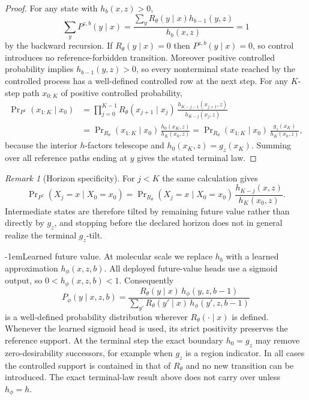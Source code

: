 \documentclass{article}
\makeatletter
\theoremstyle{definition}
\theoremstyle{remark}
\newtheorem{remark}[theorem]{Remark}
\def\paragraph{\@startsection{paragraph}{4}{\z@}{1.0ex plus 0.3ex minus .2ex}%
  {-1em}{\normalsize\bf}}
\makeatother
\begin{document}
\begin{proof}
For any state with $h_b(x,z)>0$,
\[
  \sum_y P^{z,b}(y\mid x)
  =\frac{\sum_y R_\theta(y\mid x)h_{b-1}(y,z)}{h_b(x,z)}=1
\]
by the backward recursion. If $R_\theta(y\mid x)=0$ then $P^{z,b}(y\mid x)=0$, so
control introduces no reference-forbidden transition. Moreover positive
controlled probability implies $h_{b-1}(y,z)>0$, so every nonterminal state
reached by the controlled process has a well-defined controlled row at the next
step. For any $K$-step path $x_{0:K}$ of positive controlled probability,
\[
\begin{aligned}
  \Pr\nolimits_{P^{z}}(x_{1:K}\mid x_0)
  &=\prod_{j=0}^{K-1} R_\theta(x_{j+1}\mid x_j)\,
    \frac{h_{K-j-1}(x_{j+1},z)}{h_{K-j}(x_j,z)}\\
  &=\Pr\nolimits_{R_\theta}(x_{1:K}\mid x_0)\,\frac{h_0(x_K,z)}{h_K(x_0,z)}
   =\Pr\nolimits_{R_\theta}(x_{1:K}\mid x_0)\,\frac{g_z(x_K)}{h_K(x_0,z)},
\end{aligned}
\]
because the interior $h$-factors telescope and $h_0(x_K,z)=g_z(x_K)$. Summing
over all reference paths ending at $y$ gives the stated terminal law.
\end{proof}

\begin{remark}[Horizon specificity]
For $j<K$ the same calculation gives
\[
  \Pr\nolimits_{P^{z}}(X_j=x\mid X_0=x_0)
  =\Pr\nolimits_{R_\theta}(X_j=x\mid X_0=x_0)\,\frac{h_{K-j}(x,z)}{h_K(x_0,z)} .
\]
Intermediate states are therefore tilted by remaining future value rather than
directly by $g_z$, and stopping before the declared horizon does not in general
realize the terminal $g_z$-tilt.
\end{remark}

\paragraph{Learned future value.} At molecular scale we replace $h_b$ with a
learned approximation $h_\phi(x,z,b)$. All deployed future-value heads use a
sigmoid output, so $0<h_\phi(x,z,b)<1$. Consequently
\[
  P_\phi(y\mid x,z,b)
  =\frac{R_\theta(y\mid x)\,h_\phi(y,z,b-1)}
        {\sum_{y'} R_\theta(y'\mid x)\,h_\phi(y',z,b-1)}
\]
is a well-defined probability distribution wherever $R_\theta(\cdot\mid x)$ is
defined. Whenever the learned sigmoid head is used, its strict positivity
preserves the reference support. At the terminal step the exact boundary
$h_0=g_z$ may remove zero-desirability successors, for example when $g_z$ is a
region indicator. In all cases the controlled support is contained in that of
$R_\theta$ and no new transition can be introduced. The
exact terminal-law result above does not carry over unless $h_\phi=h$.
\end{document}
